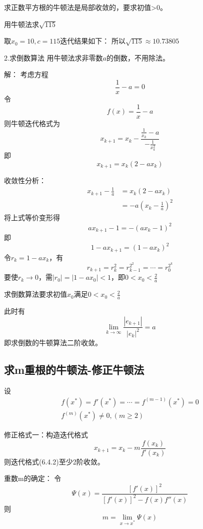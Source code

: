 \begin{remark}
    求正数平方根的牛顿法是局部收敛的，要求初值>0。
\end{remark}

\begin{example}
    用牛顿法求$\sqrt{115}$
    \begin{solution}
        取$x_0 = 10,c = 115$迭代结果如下：%
        所以$\sqrt{115} \approx 10.73805$
    \end{solution}
\end{example}

2.求倒数算法
用牛顿法求非零数$a$的倒数，不用除法。
\begin{solution}
    解：
    考虑方程
    \[\frac{1}{x}-a = 0\]
    令\[f(x) = \frac{1}{x}-a\]
    则牛顿迭代格式为
    \[x_{k+1} = x_k-\frac{\frac{1}{x_k}-a}{-\frac{1}{x_k^2}}\]
    即
    \[x_{k+1} = x_k(2-ax_k)\]

    收敛性分析：
    \begin{align*}
        x_{k+1}-\frac{1}{a} & = x_k(2-ax_k)\\
        & = -a(x_k-\frac{1}{a})^2
    \end{align*}
    将上式等价变形得
    \[ax_{k+1}-1 = -(ax_k-1)^2\]
    即
    \[1-ax_{k+1} = (1-ax_k)^2\]
    令$r_k = 1-ax_k$，有
    \[r_{k+1} = r_k^2 = r_{k-1}^{2^2} = \cdots = r_0^{2^k}\]
    要使$r_k \to 0$，需$|r_0| = |1-ax_0| < 1$，即$0 < x_0 <\frac{2}{a}$
    \begin{remark}
        求倒数算法要求初值$x_0$满足$0 < x_0 <\frac{2}{a}$
    \end{remark}
    此时有
    \[\lim_{k \to \infty}\frac{|e_{k+1}|}{|e_k|^2} = a\]
    即求倒数的牛顿算法二阶收敛。
\end{solution}


\subsection{求m重根的牛顿法-修正牛顿法}

设\begin{align*}
    f(x^*) = f'(x^*) = \cdots = f^{(m-1)}(x^*) = 0\\
    f^{(m)}(x^*) \neq 0,(m \geq 2)
\end{align*}

修正格式一：构造迭代格式
\begin{equation}
    x_{k+1} = x_k-m\frac{f(x_k)}{f'(x_k)}
\end{equation}
则迭代格式(6.4.2)至少2阶收敛。
\begin{remark}
    重数m的确定：
    令
    \begin{equation*}
        \varPsi(x) = \frac{[f'(x)]^2}{[f'(x)]^2-f(x)f''(x)}
    \end{equation*}
    则
    \begin{equation*}
        m = \lim_{x \to x^*}\varPsi(x)
    \end{equation*}
\end{remark}

